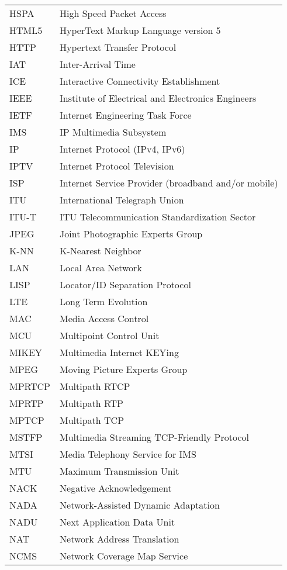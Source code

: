 \begin{longtable}{ll}
HSPA 	& High Speed Packet Access \\
HTML5	& HyperText Markup Language version 5\\
HTTP 	& Hypertext Transfer Protocol \\
IAT  	& Inter-Arrival Time \\
ICE  	& Interactive Connectivity Establishment \\
IEEE 	& Institute of Electrical and Electronics Engineers \\
IETF	& Internet Engineering Task Force \\
IMS 	& IP Multimedia Subsystem \\
IP  	& Internet Protocol (IPv4, IPv6)\\
IPTV 	& Internet Protocol Television \\
ISP 	& Internet Service Provider (broadband and/or mobile) \\
ITU 	& International Telegraph Union \\
ITU-T 	& ITU Telecommunication Standardization Sector \\
JPEG 	& Joint Photographic Experts Group \\
K-NN 	& K-Nearest Neighbor \\
LAN 	& Local Area Network \\
LISP 	& Locator/ID Separation Protocol\\
LTE 	& Long Term Evolution \\
MAC 	& Media Access Control \\
MCU 	& Multipoint Control Unit \\
MIKEY	& Multimedia Internet KEYing \\
MPEG 	& Moving Picture Experts Group \\
MPRTCP	& Multipath RTCP \\
MPRTP 	& Multipath RTP \\
MPTCP 	& Multipath TCP \\
MSTFP 	& Multimedia Streaming TCP-Friendly Protocol \\
MTSI 	& Media Telephony Service for IMS\\
MTU  	& Maximum Transmission Unit \\
NACK 	& Negative Acknowledgement \\
NADA 	& Network-Assisted Dynamic Adaptation \\
NADU 	& Next Application Data Unit \\
NAT 	& Network Address Translation \\
NCMS 	& Network Coverage Map Service\\

\end{longtable}
